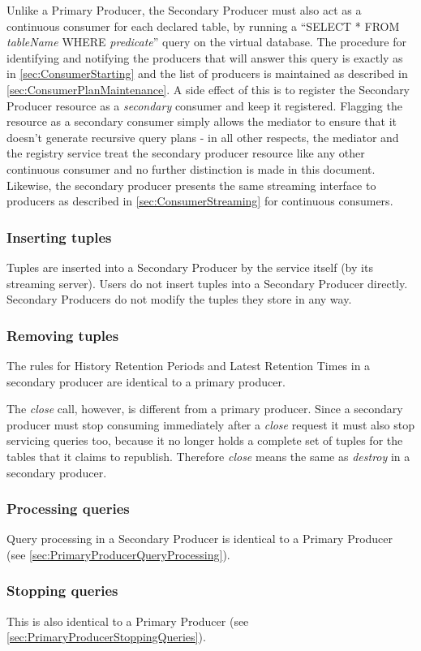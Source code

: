 Unlike a Primary Producer, the Secondary Producer must also act as a continuous
consumer for each declared table, by running a 
``SELECT * FROM \textit{tableName} WHERE \textit{predicate}'' query on the
virtual database. The procedure for identifying and notifying the producers
that will answer this query is exactly as in \ref{sec:ConsumerStarting} and
the list of producers is maintained as described in
\ref{sec:ConsumerPlanMaintenance}. A side effect of this is to register the
Secondary Producer resource as a \textit{secondary} consumer and keep it
registered. Flagging the resource as a secondary consumer simply allows
the mediator to ensure that it doesn't generate recursive query plans - in all
other respects, the mediator and the registry service treat the secondary
producer resource like any other continuous consumer and no further distinction
is made in this document. Likewise, the secondary producer presents the same
streaming interface to producers as described in
\ref{sec:ConsumerStreaming} for continuous consumers.

\subsubsection{Inserting tuples}\label{sec:SecondaryProducerInserting}
Tuples are inserted into a Secondary Producer by the service itself (by its 
streaming server). Users do not insert tuples into a Secondary Producer 
directly. Secondary Producers do not modify the tuples they store in any way.

\subsubsection{Removing tuples}\label{sec:SecondaryProducerRemoving}
The rules for History Retention Periods and Latest Retention Times in a
secondary producer are identical to a primary producer.

The \textit{close} call, however, is different from a primary producer. Since a
secondary producer must stop consuming immediately after a \textit{close}
request it must also stop servicing queries too, because it no longer holds a
complete set of tuples for the tables that it claims to republish.
Therefore \textit{close} means the same as \textit{destroy} in a secondary
producer.

\subsubsection{Processing queries}\label{sec:SecondaryProducerQueryProcessing}

Query processing in a Secondary Producer is identical to a Primary Producer
(see \ref{sec:PrimaryProducerQueryProcessing}).

\subsubsection{Stopping queries}\label{sec:SecondaryProducerStoppingQueries}

This is also identical to a Primary Producer
(see \ref{sec:PrimaryProducerStoppingQueries}).



